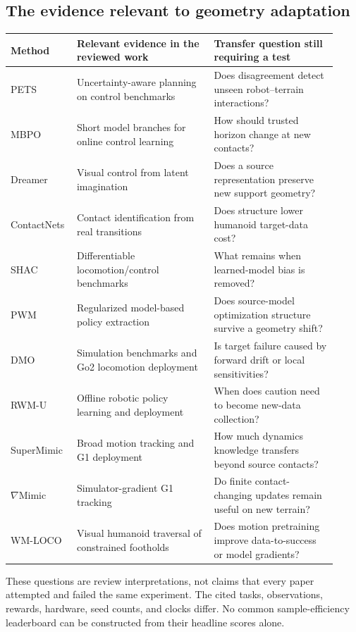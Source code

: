 \subsection{The evidence relevant to geometry adaptation}
\begin{longtable}{@{}L{0.16\linewidth}L{0.40\linewidth}L{0.36\linewidth}@{}}
\toprule Method & Relevant evidence in the reviewed work & Transfer question still requiring a test\\\midrule\endhead
PETS & Uncertainty-aware planning on control benchmarks & Does disagreement detect unseen robot--terrain interactions?\\
MBPO & Short model branches for online control learning & How should trusted horizon change at new contacts?\\
Dreamer & Visual control from latent imagination & Does a source representation preserve new support geometry?\\
ContactNets & Contact identification from real transitions & Does structure lower humanoid target-data cost?\\
SHAC & Differentiable locomotion/control benchmarks & What remains when learned-model bias is removed?\\
PWM & Regularized model-based policy extraction & Does source-model optimization structure survive a geometry shift?\\
DMO & Simulation benchmarks and Go2 locomotion deployment & Is target failure caused by forward drift or local sensitivities?\\
RWM-U & Offline robotic policy learning and deployment & When does caution need to become new-data collection?\\
SuperMimic & Broad motion tracking and G1 deployment & How much dynamics knowledge transfers beyond source contacts?\\
$\nabla$Mimic & Simulator-gradient G1 tracking & Do finite contact-changing updates remain useful on new terrain?\\
WM-LOCO & Visual humanoid traversal of constrained footholds & Does motion pretraining improve data-to-success or model gradients?\\
\bottomrule
\end{longtable}
These questions are review interpretations, not claims that every paper attempted
and failed the same experiment. The cited tasks, observations, rewards, hardware,
seed counts, and clocks differ. No common sample-efficiency leaderboard can be
constructed from their headline scores alone.

